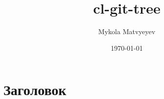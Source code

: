 \documentclass{article}
\author{Mykola Matvyeyev}
\date{\today}
\title{cl-git-tree}
\begin{document}
\maketitle
\tableofcontents

\section{Заголовок}
\label{sec:orged0ae85}
\end{document}
